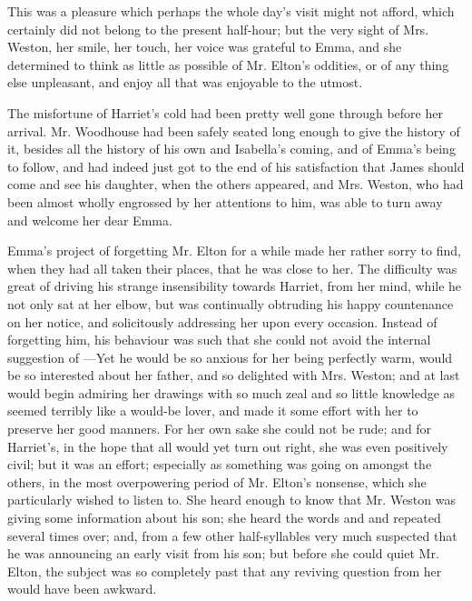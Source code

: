 This was a pleasure which perhaps the whole day's visit might not afford, which certainly did not belong to the present half-hour; but the very sight of Mrs. Weston, her smile, her touch, her voice was grateful to Emma, and she determined to think as little as possible of Mr. Elton's oddities, or of any thing else unpleasant, and enjoy all that was enjoyable to the utmost.

The misfortune of Harriet's cold had been pretty well gone through before her arrival. Mr. Woodhouse had been safely seated long enough to give the history of it, besides all the history of his own and Isabella's coming, and of Emma's being to follow, and had indeed just got to the end of his satisfaction that James should come and see his daughter, when the others appeared, and Mrs. Weston, who had been almost wholly engrossed by her attentions to him, was able to turn away and welcome her dear Emma.

Emma's project of forgetting Mr. Elton for a while made her rather sorry to find, when they had all taken their places, that he was close to her. The difficulty was great of driving his strange insensibility towards Harriet, from her mind, while he not only sat at her elbow, but was continually obtruding his happy countenance on her notice, and solicitously addressing her upon every occasion. Instead of forgetting him, his behaviour was such that she could not avoid the internal suggestion of ---Yet he would be so anxious for her being perfectly warm, would be so interested about her father, and so delighted with Mrs. Weston; and at last would begin admiring her drawings with so much zeal and so little knowledge as seemed terribly like a would-be lover, and made it some effort with her to preserve her good manners. For her own sake she could not be rude; and for Harriet's, in the hope that all would yet turn out right, she was even positively civil; but it was an effort; especially as something was going on amongst the others, in the most overpowering period of Mr. Elton's nonsense, which she particularly wished to listen to. She heard enough to know that Mr. Weston was giving some information about his son; she heard the words  and  and  repeated several times over; and, from a few other half-syllables very much suspected that he was announcing an early visit from his son; but before she could quiet Mr. Elton, the subject was so completely past that any reviving question from her would have been awkward.

